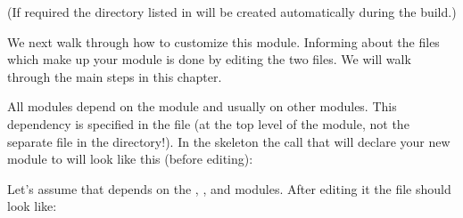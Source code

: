\documentclass[letterpaper,10pt,english]{sphinxmanual}
\renewcommand{\sphinxcode}[1]{\texttt{\small{#1}}}
\begin{document}
(If required the \sphinxcode{} directory listed in
{\hyperref[\detokenize{new-modules:step-0}]{}} will be created automatically during
the build.)

We next walk through how to customize this module.  Informing \sphinxcode{}
about the files which make up your module is done by editing the two
\sphinxcode{} files.  We will walk through the main steps in this chapter.

All  modules depend on the \sphinxcode{} module and usually on
other modules.  This dependency is specified in the \sphinxcode{} file
(at the top level of the module, not the separate \sphinxcode{} file
in the \sphinxcode{} directory!).  In the skeleton \sphinxcode{}
the call that will declare your new module to \sphinxcode{} will look
like this (before editing):

\begin{sphinxVerbatim}[commandchars=\\\{\}]
 
       \PYG{p}{[}\PYG{p}{]}
\end{sphinxVerbatim}

Let’s assume that \sphinxcode{} depends on the \sphinxcode{},
\sphinxcode{}, and \sphinxcode{} modules.  After editing it the \sphinxcode{} file
should look like:

\begin{sphinxVerbatim}[commandchars=\\\{\}]
 
       \PYG{p}{[}  \PYG{p}{]}
\end{sphinxVerbatim}
\end{document}
